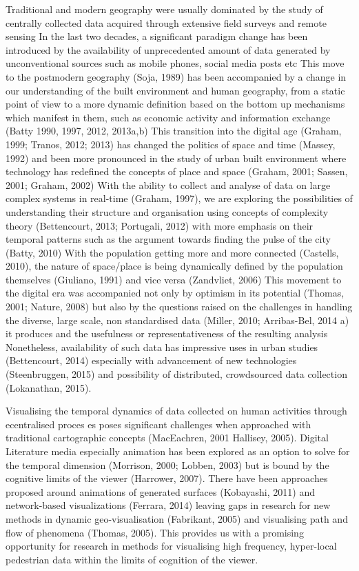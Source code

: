 Traditional and modern geography were usually dominated by the study of centrally collected data acquired through extensive field surveys and remote sensing
In the last two decades, a significant paradigm change has been introduced by the availability of unprecedented amount of data generated by unconventional sources such as mobile phones, social media posts etc
This move to the postmodern geography (Soja, 1989) has been accompanied by a change in our understanding of the built environment and human geography, from a static point of view to a more dynamic definition based on the bottom up mechanisms which manifest in them, such as economic activity and information exchange (Batty 1990, 1997, 2012, 2013a,b)
This transition into the digital age (Graham, 1999; Tranos, 2012; 2013) has changed the politics of space and time (Massey, 1992) and been more pronounced in the study of urban built environment where technology has redefined the concepts of place and space (Graham, 2001; Sassen, 2001; Graham, 2002)
With the ability to collect and analyse of data on large complex systems in real-time (Graham, 1997), we are exploring the possibilities of understanding their structure and organisation using concepts of complexity theory (Bettencourt, 2013; Portugali, 2012) with more emphasis on their temporal patterns such as the argument towards finding the pulse of the city (Batty, 2010)
With the population getting more and more connected (Castells, 2010), the nature of space/place is being dynamically defined by the population themselves (Giuliano, 1991) and vice versa (Zandvliet, 2006)
This movement to the digital era was accompanied not only by optimism in its potential (Thomas, 2001; Nature, 2008) but also by the questions raised on the challenges in handling the diverse, large scale, non standardised data (Miller, 2010; Arribas-Bel, 2014 a) it produces and the usefulness or representativeness of the resulting analysis
Nonetheless, availability of such data has impressive uses in urban studies (Bettencourt, 2014) especially with advancement of new technologies (Steenbruggen, 2015) and possibility of distributed, crowdsourced data collection (Lokanathan, 2015). 

Visualising the temporal dynamics of data collected on human activities through  ecentralised proces es poses significant challenges when approached with traditional cartographic concepts (MacEachren, 2001 Hallisey, 2005).  Digital Literature  media especially animation has been explored as an option to solve for the temporal dimension (Morrison, 2000; Lobben, 2003) but is bound by the cognitive limits of the viewer (Harrower, 2007).  There have been approaches proposed around animations of generated surfaces (Kobayashi, 2011) and network-based visualizations (Ferrara, 2014) leaving gaps in research for new methods in dynamic geo-visualisation (Fabrikant, 2005) and visualising path and flow of phenomena (Thomas, 2005).  This provides us with a promising opportunity for research in methods for visualising high frequency, hyper-local pedestrian data within the limits of cognition of the viewer.


